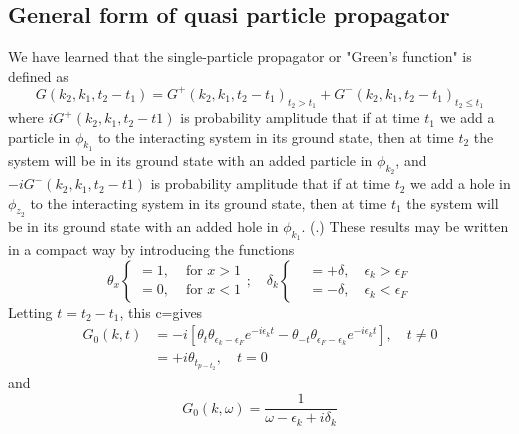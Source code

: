 \subsection{General form of quasi particle propagator}
We have learned that the single-particle propagator or "Green's function" is defined as
\begin{equation}G\left(k_{2}, k_{1}, t_{2}-t_{1}\right)=G^{+}\left(k_{2}, k_{1}, t_{2}-t_{1}\right)_{t_{2}>t_{1}}+G^{-}\left(k_{2}, k_{1}, t_{2}-t_{1}\right)_{t_{2}\leq t_{1}}\end{equation}
where $iG^+(k_2,k_1,t_2-t1)$ is probability amplitude that if at time $t_{1}$ we add a particle in $\phi_{k_{1}}$ to the interacting system in its ground state, then at time $t_{2}$ the system will be in its ground state with an added particle in $\phi_{k_{2}}$, and $-iG^-(k_2,k_1,t_2-t1)$ is probability amplitude that if at time $t_{2}$ we add a hole in $\phi_{z_{2}}$ to the interacting system in its ground state, then at time $t_{1}$ the system will be in its ground state with an added hole in $\phi_{k_{1}}$. (.) These results may be written in a compact way by introducing the functions
\begin{equation}\theta_{x}\left\{\begin{array}{lll}
=1, & \text { for } x>1 \\
=0, & \text { for } x<1
\end{array} ; \quad \delta_{k}\left\{\begin{array}{lll}
&=+\delta, \quad \epsilon_{k}>\epsilon_{F} \\
&=-\delta, \quad \epsilon_{k}<\epsilon_{F}
\end{array}\right.\right.\end{equation}
Letting $t=t_2-t_1$, this c=gives
\begin{equation}\begin{aligned}
G_{0}(k, t) &=-i\left[\theta_{t} \theta_{\epsilon_k-\epsilon_F }e^{-i\epsilon_{k} t}-\theta_{-t} \theta_{\epsilon_F-\epsilon_{k}} e^{-i\epsilon_kt}\right], \quad t \neq 0 \\
&=+i \theta_{t_{p-t_{2}}}, \quad t=0
\end{aligned}\end{equation}
and
\begin{equation}G_{0}(k, \omega)=\frac{1}{\omega-\epsilon_{k}+i \delta_{k}}\end{equation}

